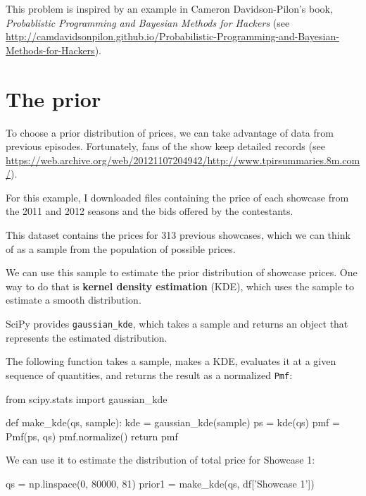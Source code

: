 \documentclass[12pt]{book}
\theoremstyle{exercise}
\newcommand{\py}[1]{{\tt #1}}%
\begin{document}

This problem is inspired by an example in Cameron Davidson-Pilon's
book, {\it Probablistic Programming and Bayesian Methods for Hackers}
(see \url{http://camdavidsonpilon.github.io/Probabilistic-Programming-and-Bayesian-Methods-for-Hackers}).



\section{The prior}

To choose a prior distribution of prices, we can take advantage
of data from previous episodes.
Fortunately, fans of the show keep detailed records (see \url{https://web.archive.org/web/20121107204942/http://www.tpirsummaries.8m.com/}).

For this example, I downloaded files containing the price of each showcase from the 2011 and 2012 seasons and the bids offered by the contestants.

This dataset contains the prices for 313 previous showcases, which we can think of as a sample from the population of possible prices.

We can use this sample to estimate the prior distribution of showcase prices.
One way to do that is {\bf kernel density estimation} (KDE), which uses the sample to estimate a smooth distribution.

SciPy provides \py{gaussian_kde}, which takes a sample and returns an object that represents the estimated distribution.

The following function takes a sample, makes a KDE, evaluates it at a given sequence of quantities, and returns the result as a normalized \py{Pmf}:

\begin{code}
from scipy.stats import gaussian_kde

def make_kde(qs, sample):
    kde = gaussian_kde(sample)
    ps = kde(qs)
    pmf = Pmf(ps, qs)
    pmf.normalize()
    return pmf
\end{code}

We can use it to estimate the distribution of total price for Showcase 1:

\begin{code}
qs = np.linspace(0, 80000, 81)
prior1 = make_kde(qs, df['Showcase 1'])
\end{code}
\end{document}
